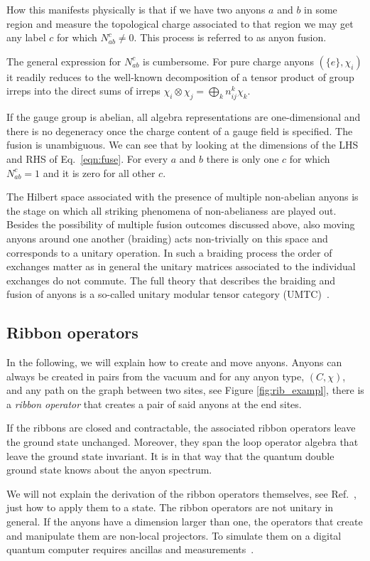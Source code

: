 \documentclass[a4paper,twocolumn,11pt, accepted=2024-06-14]{quantumarticle}
\begin{document}
How this manifests physically is that if we have two anyons $a$ and $b$ in some region and measure the topological charge associated to that region we may get any label $c$ for which $N_{ab}^c \neq 0$. This process is referred to as anyon fusion.

The general expression for $N_{ab}^c$ is cumbersome. For pure charge anyons $(\{e\}, \chi_i)$ it readily reduces to the well-known  decomposition of a tensor product of group irreps into the direct sums of irreps $\chi_i\otimes\chi_j = \bigoplus_k n^k_{ij} \chi_k$.

If the gauge group is abelian, all algebra representations are one-dimensional and there is no degeneracy once the charge content of a gauge field is specified. The fusion is unambiguous. 
We can see that by looking at the dimensions of the LHS and RHS of Eq.~\eqref{eqn:fuse}. For every $a$ and $b$ there is only one $c$ for which $N_{ab}^c=1$ and it is zero for all other $c$.

The Hilbert space associated with the presence of multiple non-abelian anyons is the stage on which all striking phenomena of non-abelianess are played out. Besides the possibility of multiple fusion outcomes discussed above,  also moving anyons around one another (braiding) acts non-trivially on this space and corresponds to a unitary operation. In such a braiding process the order of exchanges matter as in general the unitary matrices associated to the individual exchanges do not commute. The full theory that describes the braiding and fusion of anyons is a so-called unitary modular tensor category (UMTC)~\cite{Kitaev_2003}.
\subsection{Ribbon operators}\label{sec:ribbon_ops}

In the following, we will explain how to create and move anyons. Anyons can always be created in pairs from the vacuum and for any anyon type, $(C, \chi)$, and any path on the graph between two sites, see Figure \ref{fig:rib_exampl}, there is a \emph{ribbon operator} that creates a pair of said anyons at the end sites. 


If the ribbons are closed and contractable, the associated ribbon operators leave the ground state unchanged. Moreover, they span the loop operator algebra that leave the ground state invariant. It is in that way that the quantum double ground state knows about the anyon spectrum.

We will not explain the derivation of the ribbon operators themselves, see Ref.~\cite{Kitaev_2003,cui2018topological}, just how to apply them to a state.
The ribbon operators are not unitary in general. If the anyons have a dimension larger than one, the operators that create and manipulate them are non-local projectors. To simulate them on a digital quantum computer requires ancillas and measurements~\cite{Cirac}. 
\end{document}

